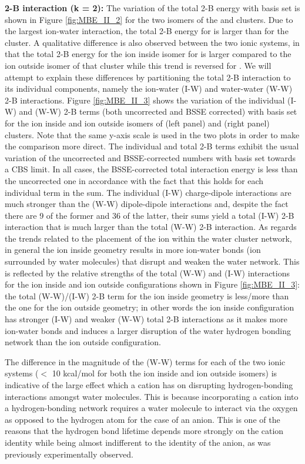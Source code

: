 \documentclass[11pt, proquest]{uwthesis}[2020/02/24]
\let\ce\ch
\begin{document}
\textbf{2-B interaction (k = 2):} The variation of the total 2-B energy with basis set is shown in Figure \ref{fig:MBE_II_2} for the two isomers of the \ce{Li^+(H2O)9} and \ce{Cl^-(H2O)9} clusters. Due to the largest ion-water interaction, the total 2-B energy for \ce{Li^+(H2O)9} is larger than for the \ce{Cl^-(H2O)9} cluster. A qualitative difference is also observed between the two ionic systems, in that the total 2-B energy for the ion inside isomer for \ce{Li^+(H2O)9} is larger compared to the ion outside isomer of that cluster while this trend is reversed for \ce{Cl^-(H2O)9}. We will attempt to explain these differences by partitioning the total 2-B interaction to its individual components, namely the ion-water (I-W) and water-water (W-W) 2-B interactions. Figure \ref{fig:MBE_II_3} shows the variation of the individual (I-W) and (W-W) 2-B terms (both uncorrected and BSSE corrected) with basis set for the ion inside and ion outside isomers of \ce{Li^+(H2O)9} (left panel) and \ce{Cl^-(H2O)9} (right panel) clusters. Note that the same y-axis scale is used in the two plots in order to make the comparison more direct. The individual and total 2-B terms exhibit the usual variation of the uncorrected and BSSE-corrected numbers with basis set towards a CBS limit. In all cases, the BSSE-corrected total interaction energy is less than the uncorrected one in accordance with the fact that this holds for each individual term in the sum. The individual (I-W) charge-dipole interactions are much stronger than the (W-W) dipole-dipole interactions and, despite the fact there are 9 of the former and 36 of the latter, their sums yield a total (I-W) 2-B interaction that is much larger than the total (W-W) 2-B interaction. As regards the trends related to the placement of the ion within the water cluster network, in general the ion inside geometry results in more ion-water bonds (ion surrounded by water molecules) that disrupt and weaken the water network. This is reflected by the relative strengths of the total (W-W) and (I-W) interactions for the ion inside and ion outside configurations shown in Figure \ref{fig:MBE_II_3}: the total (W-W)/(I-W) 2-B term for the ion inside geometry is less/more than the one for the ion outside geometry; in other words the ion inside configuration has stronger (I-W) and weaker (W-W) total 2-B interactions as it makes more ion-water bonds and induces a larger disruption of the water hydrogen bonding network than the ion outside configuration.




\par The difference in the magnitude of the (W-W) terms for each of the two ionic systems ($<$ 10 kcal/mol for both the ion inside and ion outside isomers) is indicative of the large effect which a cation has on disrupting hydrogen-bonding interactions amongst water molecules. This is because incorporating a cation into a hydrogen-bonding network requires a water molecule to interact via the oxygen as opposed to the hydrogen atom for the case of an anion. This is one of the reasons that the hydrogen bond lifetime depends more strongly on the cation identity while being almost indifferent to the identity of the anion, as was previously experimentally observed.\autocite{shalit_terahertz_2017}
\end{document}
